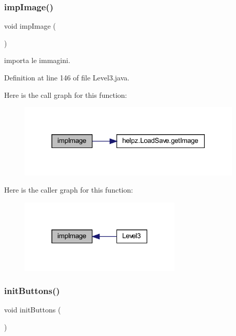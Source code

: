 \subsubsection{\texorpdfstring{imp\+Image()}{impImage()}}
{\footnotesize\ttfamily void imp\+Image (\begin{DoxyParamCaption}{ }\end{DoxyParamCaption})\hspace{0.3cm}{\ttfamily [private]}}



importa le immagini. 



Definition at line 146 of file Level3.\+java.

Here is the call graph for this function\+:\nopagebreak
\begin{figure}[H]
\begin{center}
\leavevmode
\includegraphics[width=303pt]{classscenes_1_1_level3_aded9c531b53772fd90d09a8b6bf0132e_cgraph}
\end{center}
\end{figure}
Here is the caller graph for this function\+:\nopagebreak
\begin{figure}[H]
\begin{center}
\leavevmode
\includegraphics[width=219pt]{classscenes_1_1_level3_aded9c531b53772fd90d09a8b6bf0132e_icgraph}
\end{center}
\end{figure}
\mbox{\label{classscenes_1_1_level3_a27d3ba5afb772cc36c9a432c28975ace}} 
\subsubsection{\texorpdfstring{init\+Buttons()}{initButtons()}}
{\footnotesize\ttfamily void init\+Buttons (\begin{DoxyParamCaption}{ }\end{DoxyParamCaption})\hspace{0.3cm}{\ttfamily [private]}}




